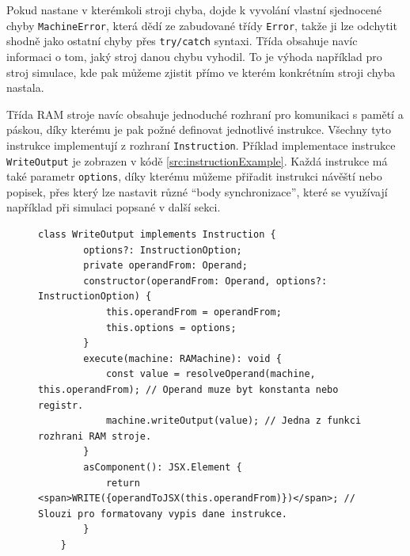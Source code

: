 Pokud nastane v kterémkoli stroji chyba, dojde k vyvolání vlastní sjednocené chyby \texttt{MachineError}, 
která dědí ze zabudované třídy \texttt{Error}, takže ji lze odchytit shodně jako ostatní chyby přes \texttt{try/catch} syntaxi.
Třída obsahuje navíc informaci o tom, jaký stroj danou chybu vyhodil. 
To je výhoda například pro stroj simulace, kde pak můžeme zjistit přímo ve kterém konkrétním stroji chyba nastala.

Třída RAM stroje navíc obsahuje jednoduché rozhraní pro komunikaci s pamětí a páskou, díky kterému je pak požné definovat jednotlivé instrukce.
Všechny tyto instrukce implementují z rozhraní \texttt{Instruction}. Příklad implementace instrukce \texttt{WriteOutput} je zobrazen v kódě \ref{src:instructionExample}.
Každá instrukce má také parametr \texttt{options}, díky kterému můžeme přiřadit instrukci návěští nebo popisek, 
přes který lze nastavit různé \enquote{body synchronizace}, které se využívají například při simulaci popsané v další sekci.

\begin{figure}[h!]
	\begin{lstlisting}[label=src:instructionExample,caption={Ukázka kódu instrukce \texttt{WriteOutput}}]
	class WriteOutput implements Instruction {
		options?: InstructionOption;
		private operandFrom: Operand;
		constructor(operandFrom: Operand, options?: InstructionOption) {
			this.operandFrom = operandFrom;
			this.options = options;
		}
		execute(machine: RAMachine): void {
			const value = resolveOperand(machine, this.operandFrom); // Operand muze byt konstanta nebo registr.
			machine.writeOutput(value); // Jedna z funkci rozhrani RAM stroje.
		}
		asComponent(): JSX.Element {
			return <span>WRITE({operandToJSX(this.operandFrom)})</span>; // Slouzi pro formatovany vypis dane instrukce.
		}
	}
	\end{lstlisting}
\end{figure}


